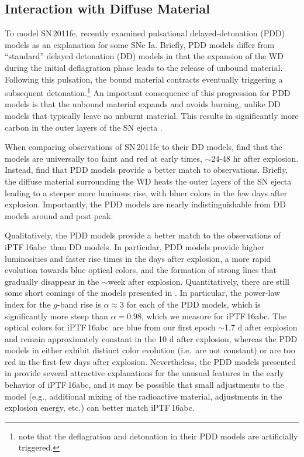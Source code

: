 \documentclass[twocolumn]{aastex61}
\newcommand{\abc}{iPTF\,16abc}
\begin{document}
\subsection{Interaction with Diffuse Material}

To model SN\,2011fe, \citet{2014MNRAS.441..532D} recently examined pulsational delayed-detonation (PDD) models as an explanation for some SNe Ia. Briefly, PDD models differ from ``standard'' delayed detonation (DD) models in that the expansion of the WD during the initial deflagration phase leads to the release of unbound material. Following this pulsation, the bound material contracts eventually triggering a subsequent detonation.\footnote{\citet{2014MNRAS.441..532D} note that the deflagration and detonation in their PDD models are artificially triggered.} An important consequence of this progression for PDD models is that the unbound material expands and avoids burning, unlike DD models that typically leave no unburnt material. This results in significantly more carbon in the outer layers of the SN ejecta \citep{2014MNRAS.441..532D}.

When comparing observations of SN\,2011fe to their DD models, \citet{2014MNRAS.441..532D} find that the models are universally too faint and red at early times, $\sim$24-48 hr after explosion.  Instead, \citet{2014MNRAS.441..532D} find that PDD models provide a better match to observations. Briefly, the diffuse material surrounding the WD heats the outer layers of the SN ejecta leading to a steeper more luminous rise, with bluer colors in the few days after explosion. Importantly, the PDD models are nearly indistinguishable from DD models around and post peak. 

Qualitatively, the PDD models provide a better match to the observations of \abc\ than DD models. In particular, PDD models provide higher luminosities and faster rise times in the days after explosion, a more rapid evolution towards blue optical colors, and the formation of strong  lines that gradually disappear in the $\sim$week after explosion. Quantitatively, there are still some short comings of the models presented in \citet{2014MNRAS.441..532D}. In particular, the power-law index for the $g$-band rise is $\alpha \approx 3$ for each of the PDD models, which is significantly more steep than $\alpha = 0.98$, which we measure for \abc. The optical colors for \abc\ are blue from our first epoch $\sim$1.7 d after explosion and remain approximately constant in the 10 d after explosion, whereas the PDD models in \citet{2014MNRAS.441..532D} either exhibit distinct color evolution (i.e.\ are not constant) or are too red in the first few days after explosion. Nevertheless, the PDD models presented in \citet{2014MNRAS.441..532D} provide several attractive explanations for the unusual features in the early behavior of \abc, and it may be possible that small adjustments to the model (e.g., additional mixing of the radioactive material, adjustments in the explosion energy, etc.) can better match \abc.
\end{document}
